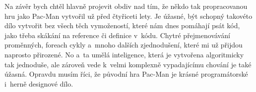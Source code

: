 \documentclass{article}
\begin{document}
Na závěr bych chtěl hlavně projevit obdiv nad tím, že někdo tak propracovanou hru jako Pac-Man vytvořil už před čtyřiceti lety. Je úžasné, být schopný takovéto dílo vytvořit bez všech těch vymožeností, které nám dnes pomáhají psát kód, jako třeba skákání na reference či definice v~kódu. Chytré přejmenovávání proměnných, foreach cykly a~mnoho dalších zjednodušení, které mi už přijdou naprosto přirozené. No a~ta umělá inteligence, která je vytvořena algoritmicky tak jednoduše, ale zároveň vede k~velmi komplexně vypadajícímu chování je také úžasná. Opravdu musím říci, že původní hra Pac-Man je krásné programátorské i~herně designové dílo.
\end{document}
